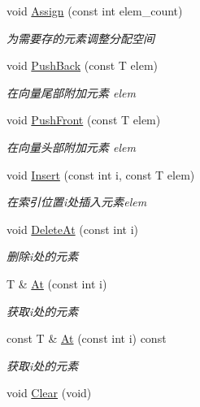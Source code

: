 \begin{DoxyCompactItemize}
\item 
void \hyperlink{class_util_1_1_vector_t_a534588bb247d3754c332c03c6954fcab}{Assign} (const int elem\-\_\-count)
\begin{DoxyCompactList}\small\item\em 为需要存的元素调整分配空间 \end{DoxyCompactList}\item 
void \hyperlink{class_util_1_1_vector_t_a90a2d20a6353a0c2ff555763df2c2bdf}{Push\-Back} (const T elem)
\begin{DoxyCompactList}\small\item\em 在向量尾部附加元素 elem \end{DoxyCompactList}\item 
void \hyperlink{class_util_1_1_vector_t_a4103b59080ffeae7b2389fdebf301a4f}{Push\-Front} (const T elem)
\begin{DoxyCompactList}\small\item\em 在向量头部附加元素 elem \end{DoxyCompactList}\item 
void \hyperlink{class_util_1_1_vector_t_a2e7e7d97535ea7164af5b6f4846f0c53}{Insert} (const int i, const T elem)
\begin{DoxyCompactList}\small\item\em 在索引位置i处插入元素elem \end{DoxyCompactList}\item 
void \hyperlink{class_util_1_1_vector_t_ad6e051af9482f6484453b3f71b746a20}{Delete\-At} (const int i)
\begin{DoxyCompactList}\small\item\em 删除i处的元素 \end{DoxyCompactList}\item 
T \& \hyperlink{class_util_1_1_vector_t_a53baf726f6ba21f7f846ed19a996235f}{At} (const int i)
\begin{DoxyCompactList}\small\item\em 获取i处的元素 \end{DoxyCompactList}\item 
const T \& \hyperlink{class_util_1_1_vector_t_a441c59007b9c8d8c468f8013f14e3a82}{At} (const int i) const 
\begin{DoxyCompactList}\small\item\em 获取i处的元素 \end{DoxyCompactList}\item 
\hypertarget{class_util_1_1_vector_t_a666071009184f0a219d94bfbd0781aab}{void \hyperlink{class_util_1_1_vector_t_a666071009184f0a219d94bfbd0781aab}{Clear} (void)}\label{class_util_1_1_vector_t_a666071009184f0a219d94bfbd0781aab}


\end{DoxyCompactItemize}
